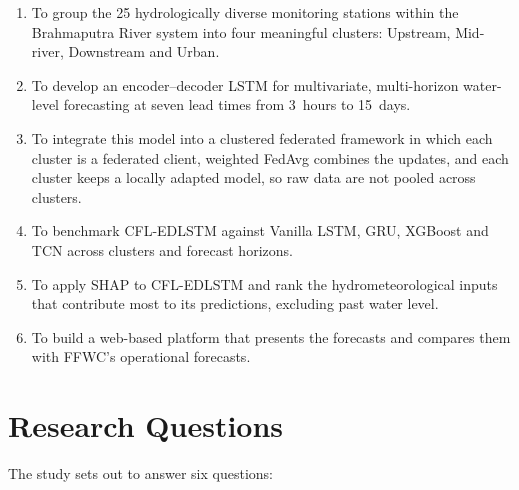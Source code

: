\begin{enumerate}
    \item To group the 25 hydrologically diverse monitoring stations within the
    Brahmaputra River system into four meaningful clusters: Upstream,
    Mid-river, Downstream and Urban.

    \item To develop an encoder--decoder LSTM for multivariate, multi-horizon
    water-level forecasting at seven lead times from 3~hours to 15~days.

    \item To integrate this model into a clustered federated framework in which
    each cluster is a federated client, weighted FedAvg combines the updates,
    and each cluster keeps a locally adapted model, so raw data are not pooled
    across clusters.

    \item To benchmark CFL-EDLSTM against Vanilla LSTM, GRU, XGBoost and TCN
    across clusters and forecast horizons.

    \item To apply SHAP to CFL-EDLSTM and rank the hydrometeorological inputs
    that contribute most to its predictions, excluding past water level.

    \item To build a web-based platform that presents the forecasts and
    compares them with FFWC's operational forecasts.
\end{enumerate}

\section{Research Questions}
\label{sec:1.9}

The study sets out to answer six questions:

